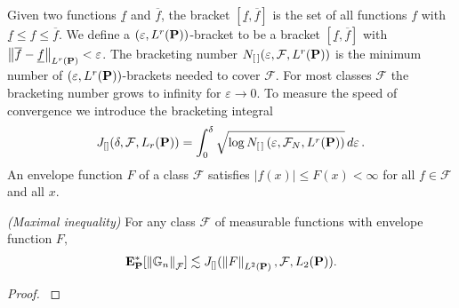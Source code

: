 Given two functions $\underline{f}$ and $\overline{f}$, the bracket
$[\underline{f},\overline{f}]$ 
is the set of all functions $f$ with 
$\underline{f}\le f \le \overline{f}$.
We define a
$(\varepsilon, L^{r}(\P))$-bracket
to be a bracket
$[\underline{f},\overline{f}]$ with
$\norm{\overline{f}-\underline{f}}_{ L^r(\P)}< \varepsilon$.
The bracketing number 
$
N_{[\,]}(\varepsilon, \mathcal{F}, L^r(\P))
$
is 
the minimum number of 
$(\varepsilon, L^{r}(\P))$-brackets needed to cover $\mathcal{F}$.
For most classes $\mathcal{F}$ the bracketing number grows to infinity for $\varepsilon\to 0$.
To measure the speed of convergence we introduce the bracketing integral
\begin{gather}
     J
    _{[]}
    (
    \delta
    ,
    \mathcal{F}
    ,
    L_r(\P)
    )
    =
  \int_0^{\delta}
      \sqrt{
        \log 
      N_{[\,]}
\left( \varepsilon, \mathcal{F}_N, L^r(\P) \right)
    }
    \,
    d\varepsilon
    \,.
\end{gather}
An envelope function $F$ of a class $\mathcal{F}$ satisfies 
$|f(x)|\le F(x)< \infty$ for all $f\in\mathcal{F}$ and all $x$.
\begin{theorem}
  \label{th:max_ineq}
  \emph{(Maximal inequality)}
  For any class $\mathcal{F}$ of measurable functions with envelope function $F,$
  \begin{gather}
    \E^*
    _\P
    [
    \norm{
      \G
      _n
      }
      _\mathcal{F}
    ]
    \lesssim
    J
    _{[]}
    (
    \norm{
      F
    }
    _{ L^2(\P)}
    ,
    \mathcal{F}
    ,
    L_2(\P)
    )
    .
  \end{gather}
\end{theorem}
\begin{proof}
  \cite[Corollary~19.35]{Vaart2000}
\end{proof}
%
